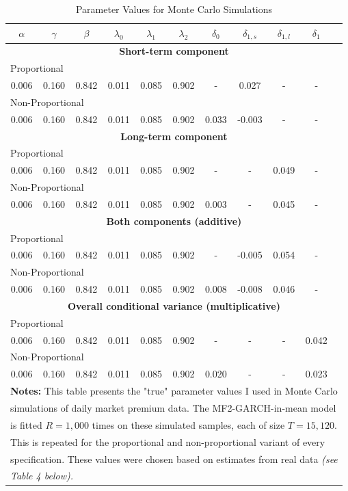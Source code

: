 \documentclass{article}
\begin{document}
\newpage
\begin{table}
\centering
\caption{Parameter Values for Monte Carlo Simulations}
\begin{tabular}{ccccccccccc}
\midrule
\midrule
$\alpha$ & $\gamma$ & $\beta$ & $\lambda_0$ & $\lambda_1$ & $\lambda_2$ & $\delta_0$ & $\delta_{1,s}$ & $\delta_{1,l}$ & $\delta_{1}$\\
\midrule
\multicolumn{11}{c}{\textbf{Short-term component}}\\
\multicolumn{11}{l}{Proportional}\\
0.006 & 0.160 & 0.842 & 0.011 & 0.085 & 0.902 & - & 0.027 & - & -\\
\multicolumn{11}{l}{Non-Proportional}\\
0.006 & 0.160 & 0.842 & 0.011 & 0.085 & 0.902 & 0.033 & -0.003 & - & -\\
\midrule
\multicolumn{11}{c}{\textbf{Long-term component}}\\
\multicolumn{11}{l}{Proportional}\\
0.006 & 0.160 & 0.842 & 0.011 & 0.085 & 0.902 & - & - & 0.049  & -\\
\multicolumn{11}{l}{Non-Proportional}\\
0.006 & 0.160 & 0.842 & 0.011 & 0.085 & 0.902 & 0.003 & - & 0.045 & -\\
\midrule
\multicolumn{11}{c}{\textbf{Both components (additive)}}\\
\multicolumn{11}{l}{Proportional}\\
0.006 & 0.160 & 0.842 & 0.011 & 0.085 & 0.902 & - & -0.005 & 0.054 & -\\
\multicolumn{11}{l}{Non-Proportional}\\
0.006 & 0.160 & 0.842 & 0.011 & 0.085 & 0.902 & 0.008 & -0.008 & 0.046 & -\\
\midrule
\multicolumn{11}{c}{\textbf{Overall conditional variance (multiplicative)}}\\
\multicolumn{11}{l}{Proportional}\\
0.006 & 0.160 & 0.842 & 0.011 & 0.085 & 0.902 & - & - & - & 0.042\\
\multicolumn{11}{l}{Non-Proportional}\\
0.006 & 0.160 & 0.842 & 0.011 & 0.085 & 0.902 & 0.020 & - & - & 0.023\\
\midrule
\multicolumn{11}{l}{\textbf{Notes:} This table presents the "true" parameter values I used in Monte Carlo}\\
\multicolumn{11}{l}{simulations of daily market premium data. The MF2-GARCH-in-mean model}\\
\multicolumn{11}{l}{is fitted $R=1,000$ times on these simulated samples, each of size $T=15,120$.}\\
\multicolumn{11}{l}{This is repeated for the proportional and non-proportional variant of every}\\
\multicolumn{11}{l}{specification. These values were chosen based on estimates from real data \textit{(see}}\\
\multicolumn{11}{l}{\textit{Table 4 below).}}\\
\midrule
\midrule
\end{tabular}
\end{table}
\end{document}
